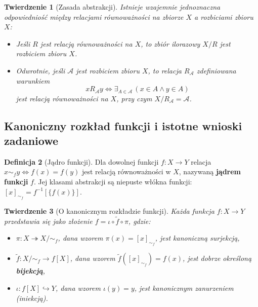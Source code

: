 \documentclass[11pt, a4paper]{article}
\theoremstyle{definition}
\newtheorem{definicja}{Definicja}[section]
\theoremstyle{plain}
\newtheorem{twierdzenie}[definicja]{Twierdzenie}
\theoremstyle{remark}
\begin{document}
\begin{twierdzenie}[Zasada abstrakcji]
Istnieje wzajemnie jednoznaczna odpowiedniość między relacjami równoważności na zbiorze $X$ a rozbiciami zbioru $X$:
\begin{itemize}
    \item Jeśli $R$ jest relacją równoważności na $X$, to zbiór ilorazowy $X / R$ jest rozbiciem zbioru $X$.
    \item Odwrotnie, jeśli $\mathcal{A}$ jest rozbiciem zbioru $X$, to relacja $R_{\mathcal{A}}$ zdefiniowana warunkiem
    \[
        x R_{\mathcal{A}} y \iff \exists_{A \in \mathcal{A}}\, (x \in A \land y \in A)
    \]
    jest relacją równoważności na $X$, przy czym $X / R_{\mathcal{A}} = \mathcal{A}$.
\end{itemize}
\end{twierdzenie}

\subsection{Kanoniczny rozkład funkcji i istotne wnioski zadaniowe}

\begin{definicja}[Jądro funkcji]
Dla dowolnej funkcji $f : X \to Y$ relacja $x \sim_f y \iff f(x) = f(y)$ jest relacją równoważności w $X$, nazywaną \textbf{jądrem funkcji} $f$. Jej klasami abstrakcji są niepuste włókna funkcji: $[x]_{\sim_f} = f^{-1}[\{f(x)\}]$.
\end{definicja}

\begin{twierdzenie}[O kanonicznym rozkładzie funkcji]
Każda funkcja $f : X \to Y$ przedstawia się jako złożenie $f = \iota \circ \tilde{f} \circ \pi$, gdzie:
\begin{itemize}
    \item $\pi : X \twoheadrightarrow X / {\sim_f}$, dana wzorem $\pi(x) = [x]_{\sim_f}$, jest kanoniczną surjekcją,
    \item $\tilde{f} : X / {\sim_f} \to f[X]$, dana wzorem $\tilde{f}([x]_{\sim_f}) = f(x)$, jest dobrze określoną \textbf{bijekcją},
    \item $\iota : f[X] \hookrightarrow Y$, dana wzorem $\iota(y) = y$, jest kanonicznym zanurzeniem (iniekcją).
\end{itemize}
\end{twierdzenie}
\end{document}
